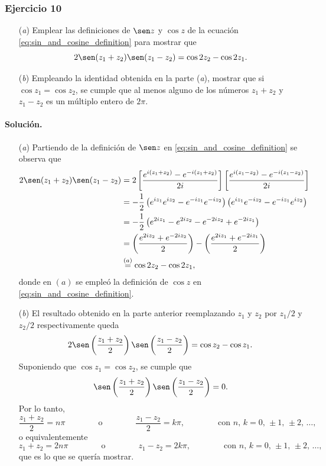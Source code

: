\documentclass[a4paper]{report}
\begin{document}
\subsubsection{Ejercicio 10}

\begin{enumerate}
 \item[(\textit{a})] Emplear las definiciones de \(\sen z\) y \(\cos z\) de la ecuación \ref{eq:sin_and_cosine_definition} para mostrar que 
 \[
  2\sen(z_1+z_2)\sen(z_1-z_2)=\cos2z_2-\cos2z_1.
 \]
 \item[(\textit{b})] Empleando la identidad obtenida en la parte (\textit{a}), mostrar que si \(\cos z_1=\cos z_2\), se cumple que al menos alguno de los números \(z_1+z_2\) y \(z_1-z_2\) es un múltiplo entero de \(2\pi\).
\end{enumerate} 

\paragraph{Solución.} 

\begin{enumerate}
 \item[(\textit{a})] Partiendo de la definición de \(\sen z\) en \ref{eq:sin_and_cosine_definition} se observa que 
 \begin{align*}
  2\sen(z_1+z_2)\sen(z_1-z_2)&=2\left[\frac{e^{i(z_1+z_2)}-e^{-i(z_1+z_2)}}{2i}\right]\left[\frac{e^{i(z_1-z_2)}-e^{-i(z_1-z_2)}}{2i}\right]\\
  &=-\frac{1}{2}\left(e^{iz_1}e^{iz_2}-e^{-iz_1}e^{-iz_2}\right)\left(e^{iz_1}e^{-iz_2}-e^{-iz_1}e^{iz_2}\right)\\
  &=-\frac{1}{2}\left(e^{2iz_1}-e^{2iz_2}-e^{-2iz_2}+e^{-2iz_1}\right)\\
  &=\left(\frac{e^{2iz_2}+e^{-2iz_2}}{2}\right)-\left(\frac{e^{2iz_1}+e^{-2iz_1}}{2}\right)\\
  &\overset{(a)}{=}\cos2z_2-\cos2z_1,
 \end{align*}
 donde en \((a)\) se empleó la definición de \(\cos z\) en \ref{eq:sin_and_cosine_definition}.
 \item[(\textit{b})] El resultado obtenido en la parte anterior reemplazando \(z_1\) y \(z_2\) por \(z_1/2\) y \(z_2/2\) respectivamente queda
 \[
  2\sen\left(\frac{z_1+z_2}{2}\right)\sen\left(\frac{z_1-z_2}{2}\right)=\cos z_2-\cos z_1.
 \]
 Suponiendo que \(\cos z_1=\cos z_2\), se cumple que 
 \[
  \sen\left(\frac{z_1+z_2}{2}\right)\sen\left(\frac{z_1-z_2}{2}\right)=0.
 \]
 Por lo tanto,
 \[
  \frac{z_1+z_2}{2}=n\pi
  \qquad\qquad\textrm{o}\qquad\qquad
  \frac{z_1-z_2}{2}=k\pi,
  \qquad\qquad\textrm{con }
  n,\,k=0,\,\pm1,\,\pm2,\,\dots,
 \]
 o equivalentemente
 \[
  z_1+z_2=2n\pi
  \qquad\qquad\textrm{o}\qquad\qquad
  z_1-z_2=2k\pi,
  \qquad\qquad\textrm{con }
  n,\,k=0,\,\pm1,\,\pm2,\,\dots,
 \]
 que es lo que se quería mostrar.
\end{enumerate} 
\end{document}

